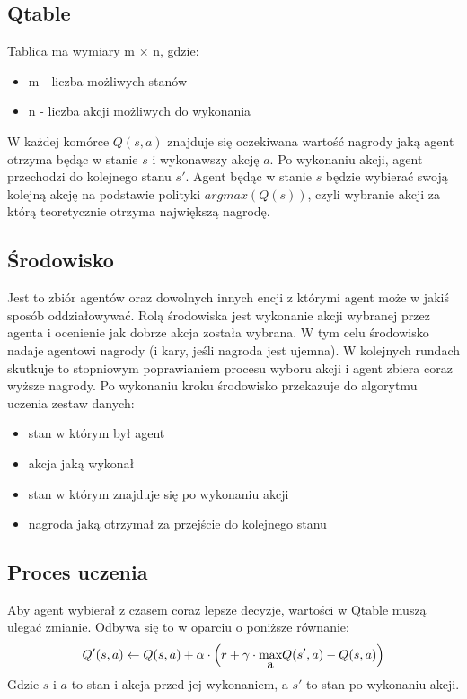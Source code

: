 \documentclass{article}
\begin{document}
\subsection{Qtable}
Tablica ma wymiary m \(\times\) n, gdzie:
\begin{itemize}
    \item m - liczba możliwych stanów
    \item n - liczba akcji możliwych do wykonania 
\end{itemize}

W każdej komórce \(Q(s,a)\) znajduje się oczekiwana wartość nagrody jaką agent otrzyma będąc w stanie \(s\) i wykonawszy akcję \(a\). Po wykonaniu akcji, agent przechodzi do kolejnego stanu \(s'\).
Agent będąc w stanie \(s\) będzie wybierać swoją kolejną akcję na podstawie polityki \(argmax(Q(s))\), czyli wybranie akcji za którą teoretycznie otrzyma największą nagrodę.
\subsection{Środowisko}
Jest to zbiór agentów oraz dowolnych innych encji z którymi agent może w jakiś sposób oddziałowywać. Rolą środowiska jest wykonanie akcji wybranej przez agenta i ocenienie jak dobrze akcja została wybrana. W tym celu środowisko nadaje agentowi nagrody (i kary, jeśli nagroda jest ujemna). W kolejnych rundach skutkuje to stopniowym poprawianiem procesu wyboru akcji i agent zbiera coraz wyższe nagrody. Po wykonaniu kroku środowisko przekazuje do algorytmu uczenia zestaw danych:
\begin{itemize}
    \item stan w którym był agent
    \item akcja jaką wykonał
    \item stan w którym znajduje się po wykonaniu akcji
    \item nagroda jaką otrzymał za przejście do kolejnego stanu
\end{itemize}
\subsection{Proces uczenia}
Aby agent wybierał z czasem coraz lepsze decyzje, wartości w Qtable muszą ulegać zmianie. Odbywa się to w oparciu o poniższe równanie:
\begin{equation}
    \label{eqn:bellman_equation}
    Q'(s, a)\leftarrow Q(s, a) + \alpha \cdot\left(r  + \gamma\cdot \stackunder{max}{a} Q(s', a) - Q(s,a) \right) 
\end{equation}
Gdzie \(s\) i \(a\) to stan i akcja przed jej wykonaniem, a  \(s'\) to stan po wykonaniu akcji.
\end{document}
